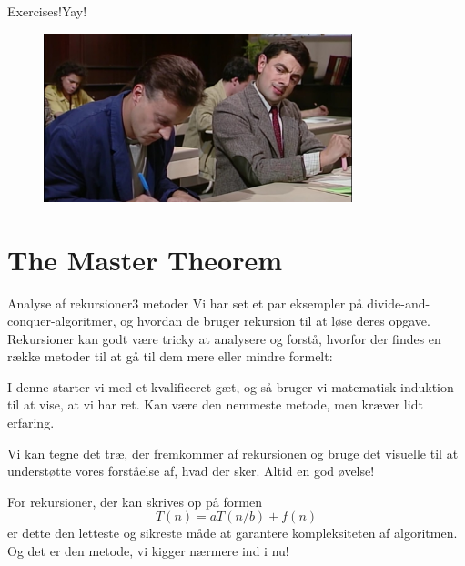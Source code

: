 \documentclass[aspectratio=1610]{beamer}
\begin{document}
\begin{frame}{Exercises!}{Yay!}
    
    \begin{figure}[h]
        \centering
        \includegraphics[width=0.8\textwidth]{exercises}
    \end{figure}
    
\end{frame}

\section{The Master Theorem}

\begin{frame}{Analyse af rekursioner}{3 metoder}
    Vi har set et par eksempler på divide-and-conquer-algoritmer, og hvordan de
    bruger rekursion til at løse deres opgave. Rekursioner kan godt være tricky
    at analysere og forstå, hvorfor der findes en række metoder til at gå til
    dem mere eller mindre formelt:

    \pause
    \begin{description}
        \item[The substitution method] I denne starter vi med et kvalificeret
            gæt, og så bruger vi matematisk induktion til at vise, at vi har
            ret. Kan være den nemmeste metode, men kræver lidt erfaring.
        \pause
        \item[The recursion-tree method] Vi kan tegne det træ, der fremkommer af
            rekursionen og bruge det visuelle til at understøtte vores
            forståelse af, hvad der sker. Altid en god øvelse!
        \pause
        \item[The Master Method] For rekursioner, der kan skrives op på formen
            \[
                T(n) = aT(n/b) + f(n)
            \] er dette den letteste og sikreste måde at garantere
            kompleksiteten af algoritmen. Og det er den metode, vi kigger
            nærmere ind i nu! 
    \end{description}
\end{frame}
\end{document}
